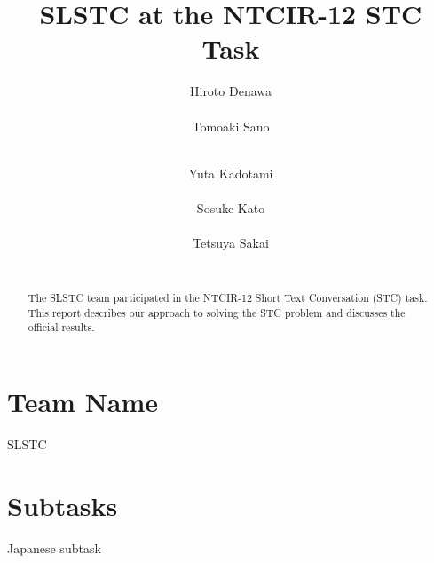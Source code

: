 \documentclass{../style/sig-alternate}
\begin{document}
\title{SLSTC at the NTCIR-12 STC Task}

\author{
%
%
\alignauthor
Hiroto Denawa\\
       \\
\alignauthor
Tomoaki Sano\\
       \\
\and  %
\alignauthor
Yuta Kadotami\\
       \\
\alignauthor
Sosuke Kato\\
       \\
\alignauthor
Tetsuya Sakai\\
       \\
}

\maketitle

\begin{abstract}
The SLSTC team participated in the NTCIR-12 Short Text Conversation
(STC) task.
This report describes our approach to solving the STC problem and discusses the
official results.
\end{abstract}

\section*{Team Name}
SLSTC

\section*{Subtasks}
Japanese subtask
\end{document}
